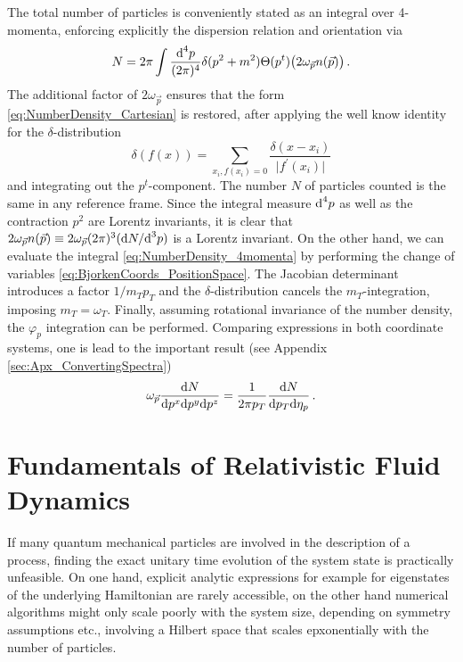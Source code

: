The total number of particles is conveniently stated as an integral over 4-momenta, enforcing explicitly the dispersion relation and orientation via 
\begin{equation}
    N=2\pi\int\frac{\text{d}^4p}{(2\pi)^4}\delta(p^2+m^2)\Theta(p^t)\big(2\omega_{\vec{p}}n(\vec{p})\big)\,.
    \label{eq:NumberDensity_4momenta}
\end{equation}
The additional factor of $2\omega_{\vec{p}}$ ensures that the form \eqref{eq:NumberDensity_Cartesian} is restored, after applying the well know identity for the $\delta$-distribution
\begin{equation}
    \delta(f(x))=\sum_{x_i, f(x_i)=0}\frac{\delta(x-x_i)}{\vert f^\prime(x_i)\vert}
\end{equation}
and integrating out the $p^t$-component. The number $N$ of particles counted is the same in any reference frame. Since the integral measure $\text{d}^4p$ as well as the contraction $p^2$ are Lorentz invariants, it is clear that ${2\omega_{\vec{p}}n(\vec{p})\equiv 2\omega_{\vec{p}}(2\pi)^3(\text{d} N/\text{d}^3p)}$ is a Lorentz invariant. On the other hand, we can evaluate the integral \eqref{eq:NumberDensity_4momenta} by performing the change of variables \eqref{eq:BjorkenCoords_PositionSpace}. The Jacobian determinant introduces a factor ${1/m_Tp_T}$ and the $\delta$-distribution cancels the $m_T$-integration, imposing $m_T=\omega_T$. Finally, assuming rotational invariance of the number density, the $\varphi_p$ integration can be performed. Comparing expressions in both coordinate systems, one is lead to the important result (see Appendix \ref{sec:Apx_ConvertingSpectra})
\begin{equation}
    \omega_{\vec{p}}\frac{\text{d} N}{\text{d} p^x\text{d} p^y\text{d} p^z}=\frac{1}{2\pi p_T}\frac{\text{d} N}{\text{d} p_T\text{d} \eta_p}\,.
    \label{eq:SpectraConversion}
\end{equation}

\section{Fundamentals of Relativistic Fluid Dynamics}

If many quantum mechanical particles are involved in the description of a process, finding the exact unitary time evolution of the system state is practically unfeasible. On one hand, explicit analytic expressions for example for eigenstates of the underlying Hamiltonian are rarely accessible, on the other hand numerical algorithms might only scale poorly with the system size, depending on symmetry assumptions etc., involving a Hilbert space that scales epxonentially with the number of particles.

